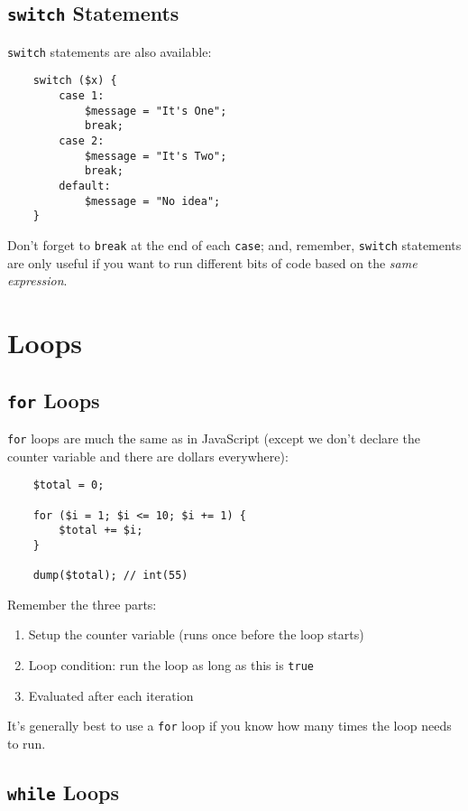 \subsection{\texttt{switch} Statements}

\texttt{switch} statements are also available:

\begin{verbatim}
    switch ($x) {
        case 1:
            $message = "It's One";
            break;
        case 2:
            $message = "It's Two";
            break;
        default:
            $message = "No idea";
    }
\end{verbatim}

Don't forget to \texttt{break} at the end of each \texttt{case}; and, remember, \texttt{switch} statements are only useful if you want to run different bits of code based on the \textit{same expression}.


\section{Loops}

\subsection{\texttt{for} Loops}

\texttt{for} loops are much the same as in JavaScript (except we don't declare the counter variable and there are dollars everywhere):

\begin{verbatim}
    $total = 0;

    for ($i = 1; $i <= 10; $i += 1) {
        $total += $i;
    }

    dump($total); // int(55)
\end{verbatim}

Remember the three parts:

\begin{enumerate}
    \item Setup the counter variable (runs once before the loop starts)
    \item Loop condition: run the loop as long as this is \texttt{true}
    \item Evaluated after each iteration
\end{enumerate}

It's generally best to use a \texttt{for} loop if you know how many times the loop needs to run.

\subsection{\texttt{while} Loops}

